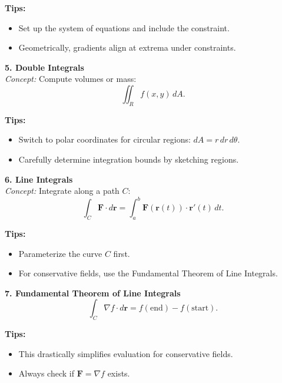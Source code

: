 \documentclass[9pt]{article}
\begin{document}
\begin{multicols}{2}
\begin{tcolorbox}[title=, colframe=brightgreen]
\textbf{Tips:}
\begin{itemize}
    \item Set up the system of equations and include the constraint.
    \item Geometrically, gradients align at extrema under constraints.
\end{itemize}
\end{tcolorbox}

\begin{tcolorbox}[title=, colframe=brightpink]
\textbf{5. Double Integrals}\\
\textit{Concept:} Compute volumes or mass:
\[
\iint_{R} f(x,y)\,dA.
\]

\textbf{Tips:}
\begin{itemize}
    \item Switch to polar coordinates for circular regions: $dA=r\,dr\,d\theta$.
    \item Carefully determine integration bounds by sketching regions.
\end{itemize}
\end{tcolorbox}

\begin{tcolorbox}[title=, colframe=brightyellow]
\textbf{6. Line Integrals}\\
\textit{Concept:} Integrate along a path $C$:
\[
\int_C \mathbf{F}\cdot d\mathbf{r}=\int_a^b \mathbf{F}(\mathbf{r}(t))\cdot \mathbf{r}'(t)\,dt.
\]

\textbf{Tips:}
\begin{itemize}
    \item Parameterize the curve $C$ first.
    \item For conservative fields, use the Fundamental Theorem of Line Integrals.
\end{itemize}
\end{tcolorbox}

\begin{tcolorbox}[title=, colframe=brightblue]
\textbf{7. Fundamental Theorem of Line Integrals}\\
\[
\int_C \nabla f \cdot d\mathbf{r}=f(\text{end})-f(\text{start}).
\]

\textbf{Tips:}
\begin{itemize}
    \item This drastically simplifies evaluation for conservative fields.
    \item Always check if $\mathbf{F}=\nabla f$ exists.
\end{itemize}
\end{tcolorbox}


\end{multicols}
\end{document}
